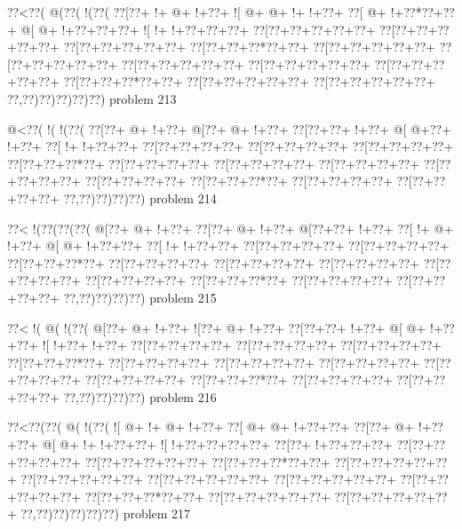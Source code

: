 \vbox{\vbox{\goo
\0??<\0??(\- @(\0??(\- !(\0??(
\0??[\0??+\- !+\- @+\- !+\0??+
\- ![\- @+\- @+\- !+\- !+\0??+
\0??[\- @+\- !+\0??*\0??+\0??+
\- @[\- @+\- !+\0??+\0??+\0??+
\- ![\- !+\- !+\0??+\0??+\0??+
\0??[\0??+\0??+\0??+\0??+\0??+
\0??[\0??+\0??+\0??+\0??+\0??+
\0??[\0??+\0??+\0??+\0??+\0??+
\0??[\0??+\0??+\0??*\0??+\0??+
\0??[\0??+\0??+\0??+\0??+\0??+
\0??[\0??+\0??+\0??+\0??+\0??+
\0??[\0??+\0??+\0??+\0??+\0??+
\0??[\0??+\0??+\0??+\0??+\0??+
\0??[\0??+\0??+\0??+\0??+\0??+
\0??[\0??+\0??+\0??*\0??+\0??+
\0??[\0??+\0??+\0??+\0??+\0??+
\0??[\0??+\0??+\0??+\0??+\0??+
\0??,\0??)\0??)\0??)\0??)\0??)
}
\hfil problem 213\hfil\break
}

\vbox{\vbox{\goo
\- @<\0??(\- !(\- !(\0??(
\0??[\0??+\- @+\- !+\0??+
\- @[\0??+\- @+\- !+\0??+
\0??[\0??+\0??+\- !+\0??+
\- @[\- @+\0??+\- !+\0??+
\0??[\- !+\- !+\0??+\0??+
\0??[\0??+\0??+\0??+\0??+
\0??[\0??+\0??+\0??+\0??+
\0??[\0??+\0??+\0??+\0??+
\0??[\0??+\0??+\0??*\0??+
\0??[\0??+\0??+\0??+\0??+
\0??[\0??+\0??+\0??+\0??+
\0??[\0??+\0??+\0??+\0??+
\0??[\0??+\0??+\0??+\0??+
\0??[\0??+\0??+\0??+\0??+
\0??[\0??+\0??+\0??*\0??+
\0??[\0??+\0??+\0??+\0??+
\0??[\0??+\0??+\0??+\0??+
\0??,\0??)\0??)\0??)\0??)
}
\hfil problem 214\hfil\break
}

\vbox{\vbox{\goo
\0??<\- !(\0??(\0??(\0??(
\- @[\0??+\- @+\- !+\0??+
\0??[\0??+\- @+\- !+\0??+
\- @[\0??+\0??+\- !+\0??+
\0??[\- !+\- @+\- !+\0??+
\- @[\- @+\- !+\0??+\0??+
\0??[\- !+\- !+\0??+\0??+
\0??[\0??+\0??+\0??+\0??+
\0??[\0??+\0??+\0??+\0??+
\0??[\0??+\0??+\0??*\0??+
\0??[\0??+\0??+\0??+\0??+
\0??[\0??+\0??+\0??+\0??+
\0??[\0??+\0??+\0??+\0??+
\0??[\0??+\0??+\0??+\0??+
\0??[\0??+\0??+\0??+\0??+
\0??[\0??+\0??+\0??*\0??+
\0??[\0??+\0??+\0??+\0??+
\0??[\0??+\0??+\0??+\0??+
\0??,\0??)\0??)\0??)\0??)
}
\hfil problem 215\hfil\break
}

\vbox{\vbox{\goo
\0??<\- !(\- @(\- !(\0??(
\- @[\0??+\- @+\- !+\0??+
\- ![\0??+\- @+\- !+\0??+
\0??[\0??+\0??+\- !+\0??+
\- @[\- @+\- !+\0??+\0??+
\- ![\- !+\0??+\- !+\0??+
\0??[\0??+\0??+\0??+\0??+
\0??[\0??+\0??+\0??+\0??+
\0??[\0??+\0??+\0??+\0??+
\0??[\0??+\0??+\0??*\0??+
\0??[\0??+\0??+\0??+\0??+
\0??[\0??+\0??+\0??+\0??+
\0??[\0??+\0??+\0??+\0??+
\0??[\0??+\0??+\0??+\0??+
\0??[\0??+\0??+\0??+\0??+
\0??[\0??+\0??+\0??*\0??+
\0??[\0??+\0??+\0??+\0??+
\0??[\0??+\0??+\0??+\0??+
\0??,\0??)\0??)\0??)\0??)
}
\hfil problem 216\hfil\break
}

\vbox{\vbox{\goo
\0??<\0??(\0??(\- @(\- !(\0??(
\- ![\- @+\- !+\- @+\- !+\0??+
\0??[\- @+\- @+\- !+\0??+\0??+
\0??[\0??+\- @+\- !+\0??+\0??+
\- @[\- @+\- !+\- !+\0??+\0??+
\- ![\- !+\0??+\0??+\0??+\0??+
\0??[\0??+\- !+\0??+\0??+\0??+
\0??[\0??+\0??+\0??+\0??+\0??+
\0??[\0??+\0??+\0??+\0??+\0??+
\0??[\0??+\0??+\0??*\0??+\0??+
\0??[\0??+\0??+\0??+\0??+\0??+
\0??[\0??+\0??+\0??+\0??+\0??+
\0??[\0??+\0??+\0??+\0??+\0??+
\0??[\0??+\0??+\0??+\0??+\0??+
\0??[\0??+\0??+\0??+\0??+\0??+
\0??[\0??+\0??+\0??*\0??+\0??+
\0??[\0??+\0??+\0??+\0??+\0??+
\0??[\0??+\0??+\0??+\0??+\0??+
\0??,\0??)\0??)\0??)\0??)\0??)
}
\hfil problem 217\hfil\break
}

